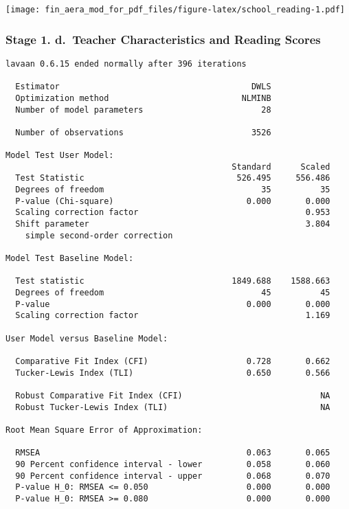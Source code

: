 \documentclass[
]{article}
\begin{document}
\texttt{[image: fin\_aera\_mod\_for\_pdf\_files/figure-latex/school\_reading-1.pdf]}

\hypertarget{stage-1.-d.-teacher-characteristics-and-reading-scores}{%
\subsubsection{Stage 1. d.~Teacher Characteristics and Reading
Scores}\label{stage-1.-d.-teacher-characteristics-and-reading-scores}}

\begin{verbatim}
lavaan 0.6.15 ended normally after 396 iterations

  Estimator                                       DWLS
  Optimization method                           NLMINB
  Number of model parameters                        28

  Number of observations                          3526

Model Test User Model:
                                              Standard      Scaled
  Test Statistic                               526.495     556.486
  Degrees of freedom                                35          35
  P-value (Chi-square)                           0.000       0.000
  Scaling correction factor                                  0.953
  Shift parameter                                            3.804
    simple second-order correction                                

Model Test Baseline Model:

  Test statistic                              1849.688    1588.663
  Degrees of freedom                                45          45
  P-value                                        0.000       0.000
  Scaling correction factor                                  1.169

User Model versus Baseline Model:

  Comparative Fit Index (CFI)                    0.728       0.662
  Tucker-Lewis Index (TLI)                       0.650       0.566
                                                                  
  Robust Comparative Fit Index (CFI)                            NA
  Robust Tucker-Lewis Index (TLI)                               NA

Root Mean Square Error of Approximation:

  RMSEA                                          0.063       0.065
  90 Percent confidence interval - lower         0.058       0.060
  90 Percent confidence interval - upper         0.068       0.070
  P-value H_0: RMSEA <= 0.050                    0.000       0.000
  P-value H_0: RMSEA >= 0.080                    0.000       0.000
                                                                  

\end{verbatim}
\end{document}
